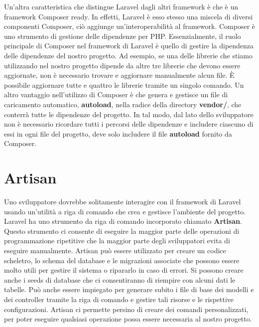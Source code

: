Un'altra caratteristica che distingue Laravel dagli altri framework è che è un framework Composer ready. In effetti, Laravel è esso stesso una miscela di diversi componenti Composer, ciò aggiunge un'interoperabilità al framework.
Composer è uno strumento di gestione delle dipendenze per PHP. Essenzialmente, il ruolo principale di Composer nel framework di Laravel è quello di gestire la dipendenza delle dipendenze del nostro progetto. Ad esempio, se una delle librerie che stiamo utilizzando nel nostro progetto dipende da altre tre librerie che devono essere aggiornate, non è necessario trovare e aggiornare manualmente alcun file. È possibile aggiornare tutte e quattro le librerie tramite un singolo comando.
Un altro vantaggio nell'utilizzo di Composer è che genera e gestisce un file di caricamento automatico, \textbf{autoload}, nella radice della directory \textbf{vendor/}, che conterrà tutte le dipendenze del progetto. In tal modo, dal lato dello sviluppatore non è necessario ricordare tutti i percorsi delle dipendenze e includere ciascuno di essi in ogni file del progetto, deve solo includere il file \textbf{autoload} fornito da Composer. 

\section{Artisan}

Uno sviluppatore dovrebbe solitamente interagire con il framework di Laravel usando un'utilità a riga di comando che crea e gestisce l'ambiente del progetto. Laravel ha uno strumento da riga di comando incorporato chiamato \textbf{Artisan}. Questo strumento ci consente di eseguire la maggior parte delle operazioni di programmazione ripetitive che la maggior parte degli sviluppatori evita di eseguire manualmente.
Artisan può essere utilizzato per creare un codice scheletro, lo schema del database e le migrazioni associate che possono essere molto utili per gestire il sistema o ripararlo in caso di errori. Si possono creare anche i seeds di database che ci consentiranno di riempire con alcuni dati le tabelle. Può anche essere impiegato per generare subito i file di base dei modelli e dei controller tramite la riga di comando e gestire tali risorse e le rispettive configurazioni. 
Artisan ci permette persino di creare dei comandi personalizzati, per poter eseguire qualsiasi operazione possa essere necessaria al nostro progetto.
